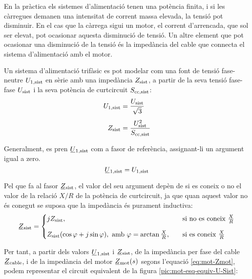 En la pràctica els sistemes d'alimentació tenen una potència finita, i si les càrregues demanen una intensitat de corrent massa elevada, la tensió pot disminuir. En el cas que la càrrega sigui un motor, el corrent d'arrencada, que sol ser elevat, pot ocasionar aquesta disminució de tensió. Un altre element que pot ocasionar una disminució de la tensió és la impedància del cable que connecta el sistema d'alimentació amb el motor.

Un sistema d'alimentació trifàsic es pot modelar com una font de tensió fase-neutre $U_\mathrm{1,sist}$ en sèrie amb una impedància $Z_\mathrm{sist}$, a partir de la seva tensió fase-fase $U_\mathrm{sist}$ i la seva potència de curtcircuit $S_\mathrm{cc,sist}$:
\begin{align}
	U_\mathrm{1,sist} &= \frac{U_\mathrm{sist}}{\sqrt{3}} \\[1ex]
	Z_\mathrm{sist} &= \frac{U_\mathrm{sist}^2}{S_\mathrm{cc,sist}}
\end{align}

Generalment, es pren $\cmplx{U}\ped{1,sist}$ com a fasor de referència, assignant-li un argument igual a zero. 
\begin{equation}
	\cmplx{U}\ped{1,sist} = U\ped{1,sist}
\end{equation}

Pel que fa al fasor  $\cmplx{Z}\ped{sist}$, el valor del seu argument depèn de si es coneix o no el valor de la relació $X/R$ de la potència de curtcircuit, ja que quan aquest valor no és conegut se suposa que la impedància és purament inductiva:
\begin{equation}
	\cmplx{Z}\ped{sist} = 
	\begin{cases}
		j Z\ped{sist},  & \quad\text{si no es coneix }\frac{X}{R}  \\[2ex]
		Z\ped{sist} (\cos\varphi+j\sin\varphi), \text{ amb } \varphi=\arctan\frac{X}{R}, & \quad\text{si es coneix } \frac{X}{R} 
	\end{cases}
\end{equation}

Per tant, a partir dels valors $\cmplx{U}\ped{1,sist}$ i $\cmplx{Z}\ped{sist}$, de la impedància per fase del cable $\cmplx{Z}\ped{cable}$, i de la impedància del motor $\cmplx{Z}\ped{mot}(s)$ segons l'equació \eqref{eq:mot-Zmot}, podem representar el circuit equivalent de la figura \vref{pic:mot-esq-equiv-U-Sist}:

\begin{center}
	
	\label{pic:mot-esq-equiv-U-Sist}
\end{center}

